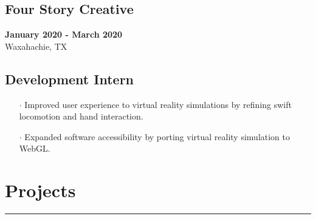 \documentclass[10pt]{article}
\begin{document}
\begin{paracol}{2}
    \begin{leftcolumn} 
        \sloppy
        \subsection*{Four Story Creative}
        \textbf{January 2020 -  March 2020} \\ 
        Waxahachie, TX
    \end{leftcolumn}

    \begin{rightcolumn} 
        \subsection*{Development Intern}
        \begin{itemize}[leftmargin=.28cm, itemsep=1pt]
            \item[$\cdot$] Improved user experience to virtual reality simulations by refining swift locomotion and hand interaction.
            \item[$\cdot$] Expanded software accessibility by porting virtual reality simulation to WebGL.
        \end{itemize}
    \end{rightcolumn}
\end{paracol}


\section*{Projects}
\vspace{-.6cm}
\par\noindent\textcolor{black}{\rule{\textwidth}{.5pt}}
\vspace{-.8cm}
\end{document}
